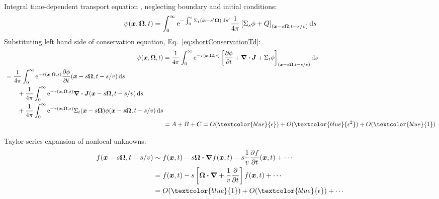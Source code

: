 \documentclass{beamer}
\begin{document}
\begin{frame}
  Integral time-dependent transport equation \cite{Pri2010}, neglecting
  boundary and initial conditions:
  \begin{equation} \label{eq:integralAngularFluxShortened}
    \psi(\bm{x}, \bm{\Omega}, t) = 
    \int_{0}^{\infty}
    \mathop{}\!\mathrm{e}^{ - \int_{0}^{s} \Sigma_t(\bm{x}-s'\bm{\Omega}) \mathop{}\!\mathrm{d} s'}
    \frac{1}{4\pi}
    \left[ \Sigma_s \phi + Q \right]_{(\bm{x} - s \bm{\Omega}, t-s/v)}
    \mathop{}\!\mathrm{d} s
  \end{equation}
  Substituting left hand side of conservation equation,
  Eq.~\eqref{eq:shortConservationTd}:
  \begin{align*}
    \psi(\vec{x}, \vec{\Omega}, t) &= 
    \frac{1}{4\pi} \int_{0}^{\infty}
    \eexp^{ - \tau(\vec{x},\vec{\Omega},s)}
       \left[ \pder{\phi}{t} + \del \vd \vec{J}
    + \Sigma_t \phi\right]_{(\vec{x} - s \vec{\Omega}, t-s/v)}
    \ud s
    \\
    \begin{split}
    &= 
    \frac{1}{4\pi} \int_{0}^{\infty} \eexp^{ - \tau(\vec{x},\vec{\Omega},s)}
    \pder{\phi}{t}(\vec{x} - s \vec{\Omega}, t-s/v) \ud s
    \\&\qquad + 
    \frac{1}{4\pi} \int_{0}^{\infty} \eexp^{ - \tau(\vec{x},\vec{\Omega},s)}
    \del \vd \vec{J}(\vec{x} - s \vec{\Omega}, t-s/v) \ud s
    \\&\qquad +
    \frac{1}{4\pi} \int_{0}^{\infty} \eexp^{ - \tau(\vec{x},\vec{\Omega},s)}
    \Sigma_t(\vec{x} - s \vec{\Omega}) \phi(\vec{x} - s \vec{\Omega}, t-s/v)
    \ud s
    \end{split}
    \\
    &= A + B + C = O(\textcolor{blue}{\epsilon}) +
    O(\textcolor{blue}{\epsilon^2}) + O(\textcolor{blue}{1})
  \end{align*}
\end{frame}
\begin{frame}
  Taylor series expansion of nonlocal unknowns:
  \begin{align*}
    f(\vec{x} - s \vec{\Omega}, t-s/v)
    &\sim
    f(\vec{x}, t) - s \vec{\Omega} \vd \del f(\vec{x}, t)
    - s\frac{1}{v} \pder{f}{t}(\vec{x}, t) + \cdots
    \\
    &= f(\vec{x}, t) - s \left[ \vec{\Omega} \vd \del
    + \frac{1}{v} \pder{}{t} \right] f(\vec{x}, t) + \cdots
    \\
    &= O(\textcolor{blue}{1}) +
    O(\textcolor{blue}{\epsilon}) + \cdots
  \end{align*}
\end{frame}
\end{document}
